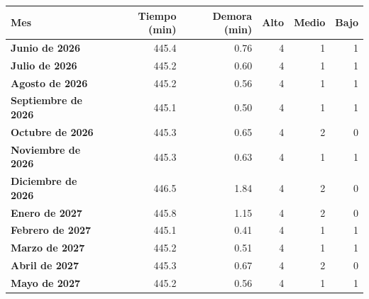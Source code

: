 \renewcommand{\arraystretch}{1.2}
\begin{tabular}{|l|r|r|r|r|r|}
\hline
\rowcolor{gray!20} \textbf{Mes} & \textbf{Tiempo (min)} & \textbf{Demora (min)} & \textbf{Alto} & \textbf{Medio} & \textbf{Bajo} \\
\hline
\textbf{Junio de 2026} & 445.4 & 0.76 & 4 & 1 & 1 \\
\hline
\textbf{Julio de 2026} & 445.2 & 0.60 & 4 & 1 & 1 \\
\hline
\textbf{Agosto de 2026} & 445.2 & 0.56 & 4 & 1 & 1 \\
\hline
\textbf{Septiembre de 2026} & 445.1 & 0.50 & 4 & 1 & 1 \\
\hline
\textbf{Octubre de 2026} & 445.3 & 0.65 & 4 & 2 & 0 \\
\hline
\textbf{Noviembre de 2026} & 445.3 & 0.63 & 4 & 1 & 1 \\
\hline
\textbf{Diciembre de 2026} & 446.5 & 1.84 & 4 & 2 & 0 \\
\hline
\textbf{Enero de 2027} & 445.8 & 1.15 & 4 & 2 & 0 \\
\hline
\textbf{Febrero de 2027} & 445.1 & 0.41 & 4 & 1 & 1 \\
\hline
\textbf{Marzo de 2027} & 445.2 & 0.51 & 4 & 1 & 1 \\
\hline
\textbf{Abril de 2027} & 445.3 & 0.67 & 4 & 2 & 0 \\
\hline
\textbf{Mayo de 2027} & 445.2 & 0.56 & 4 & 1 & 1 \\
\hline
\end{tabular}
